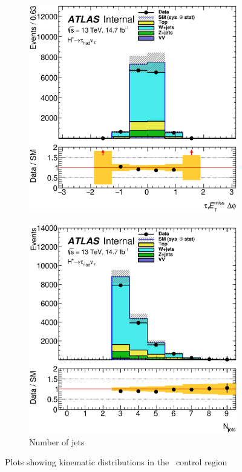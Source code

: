 \begin{figure}[!h]
\begin{subfigure}{0.5\textwidth}
\caption{\mT}
\end{subfigure}
\begin{subfigure}{0.5\textwidth}
   \includegraphics[width=\textwidth]{figures/taumetphi_Wjets.eps}
\caption{}
\end{subfigure} %
\begin{subfigure}{0.5\textwidth}
   \includegraphics[width=\textwidth]{figures/nJets_Wjets.eps}
\caption{Number of jets}
\end{subfigure}
\caption{Plots showing kinematic distributions in the \Wjets\ control region}
\label{fig:wjetsCR}
\end{figure}


